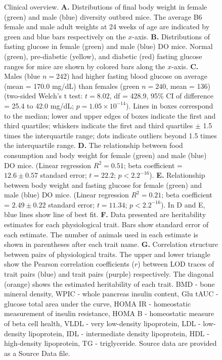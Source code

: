 \documentclass[
]{article}
\begin{document}
\begin{figure}[ht!]
\caption{Clinical overview. \textbf{A.} Distributions of final body 
weight in female (green) and male (blue) diversity outbred mice.
The average B6 female and male adult weights at 24 weeks of 
age are indicated by green and blue bars respectively on the 
$x$-axis. \textbf{B.} Distributions of fasting glucose in female 
(green) and male (blue) DO mice. Normal (green), pre-diabetic
(yellow), and diabetic (red) fasting glucose ranges for mice are 
shown by colored bars along the $x$-axis. \textbf{C.} Males 
(blue $n = 242$) had higher fasting blood glucose on average 
(mean = 170.0 mg/dL) than females (green $n = 240$, 
mean = 136) (two-sided Welch's t test: $t = 8.02$, 
df = 428.9, 95\% CI of difference = 25.4 to 42.0 mg/dL; 
$p = 1.05\times10^{-14}$). Lines in boxes 
correspond to the median; lower and upper edges of 
boxes indicate the first and third quartiles; whiskers 
indicate the first and third quartiles $\pm$ 1.5 times
the interquartile range; dots indicate outliers beyond 1.5 times
the interquartile range. \textbf{D.} The relationship between 
food consumption and body weight for female (green) and 
male (blue) DO mice. (Linear regression 
$R^2 = 0.51$;  beta coefficient = $12.6\pm0.57$ 
standard error; $t = 22.2$; $p < 2.2^{-16}$). \textbf{E.} 
Relationship between body weight and fasting glucose for 
female (green) and male (blue) DO mice. (Linear regression 
$R^2 = 0.21$; beta coefficient = $2.49\pm 0.22$ 
standard error; $t = 11.34$; $p < 2.2^{-16}$). In D and E,
blue lines show line of best fit. \textbf{F.} Data 
presented are heritability estimates for each physiological trait. 
Bars show standard error of each estimate. The number of animals 
used in each estimate is shown in parentheses after each trait name. 
\textbf{G.} Correlation structure between pairs of physiological 
traits. The upper and lower triangle show the Pearson correlation 
coefficients ($r$) between LOD traces of trait pairs (blue) and trait 
pairs (purple) respectively. The diagonal (orange) shows the estimated 
heritability of each trait. BMD - bone mineral density, WPIC - whole 
pancreas insulin content, Glu tAUC - glucose total area under the 
curve, HOMA IR - homeostatic measurement of insulin resistance, 
HOMA B - homeostatic measure of beta cell health, VLDL - very 
low-density lipoprotein, LDL - low-density lipoprotein, IDL - intermediate 
density lipoprotein, HDL - high-density lipoprotein, TG - triglyceride. 
Source data are provided as a Source Data file.
}
\label{fig:trait_overview}
\end{figure}
\end{document}
